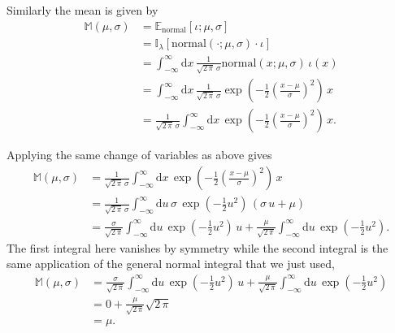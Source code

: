 \documentclass[
  letterpaper,
  DIV=11,
  numbers=noendperiod]{scrartcl}
\begin{document}
Similarly the mean is given by \begin{align*}
\mathbb{M}(\mu, \sigma)
&=
\mathbb{E}_{\mathrm{normal}}[ \iota ; \mu, \sigma ]
\\
&=
\mathbb{I}_{\lambda}[\mathrm{normal}(\cdot; \mu, \sigma) \cdot \iota ]
\\
&=
\int_{-\infty}^{\infty} \mathrm{d} x \, \frac{1}{\sqrt{2 \, \pi} \, \sigma}
\mathrm{normal}(x; \mu, \sigma) \, \iota(x)
\\
&=
\int_{-\infty}^{\infty} \mathrm{d} x \, \frac{1}{\sqrt{2 \, \pi} \, \sigma}
\exp \left( -\frac{1}{2} \left( \frac{x - \mu}{\sigma} \right)^{2} \right) \, x
\\
&=
\frac{1}{\sqrt{2 \, \pi} \, \sigma} \int_{-\infty}^{\infty} \mathrm{d} x \,
\exp \left( -\frac{1}{2} \left( \frac{x - \mu}{\sigma} \right)^{2} \right) \, x.
\end{align*}

Applying the same change of variables as above gives \begin{align*}
\mathbb{M}(\mu, \sigma)
&=
\frac{1}{\sqrt{2 \, \pi} \, \sigma}
\int_{-\infty}^{\infty} \mathrm{d} x \,
\exp \left( -\frac{1}{2} \left( \frac{x - \mu}{\sigma} \right)^{2} \right) \, x
\\
&=
\frac{1}{\sqrt{2 \, \pi} \, \sigma}
\int_{-\infty}^{\infty} \mathrm{d} u \, \sigma \,
\exp \left( -\frac{1}{2} u^{2} \right) \, \left( \sigma \, u + \mu \right)
\\
&=
\frac{\sigma}{\sqrt{2 \, \pi}}
\int_{-\infty}^{\infty} \mathrm{d} u \,
\exp \left( -\frac{1}{2} u^{2} \right) \, u
+
\frac{\mu}{\sqrt{2 \, \pi}}
\int_{-\infty}^{\infty} \mathrm{d} u \,
\exp \left( -\frac{1}{2} u^{2} \right).
\end{align*} The first integral here vanishes by symmetry while the
second integral is the same application of the general normal integral
that we just used, \begin{align*}
\mathbb{M}(\mu, \sigma)
&=
\frac{\sigma}{\sqrt{2 \, \pi}} \int_{-\infty}^{\infty} \mathrm{d} u \,
\exp \left( -\frac{1}{2} u^{2} \right) \, u
+
\frac{\mu}{\sqrt{2 \, \pi}} \int_{-\infty}^{\infty} \mathrm{d} u \,
\exp \left( -\frac{1}{2} u^{2} \right)
\\
&=
0
+
\frac{\mu}{\sqrt{2 \, \pi}} \sqrt{2 \, \pi}
\\
&=
\mu.
\end{align*}
\end{document}
